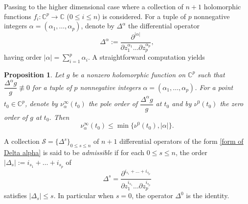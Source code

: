 \documentclass[english, 12pt]{amsart}
\theoremstyle{plain}
\newtheorem{pro}[thm]{Proposition}
\theoremstyle{remark}
\numberwithin{equation}{section}
\theoremstyle{plain}
\theoremstyle{named}
\begin{document}
Passing to the higher dimensional case where a collection of $n+1$ holomorphic functions $f_i\colon\mathbb{C}^p\rightarrow \mathbb{C}$ ($0\leq i\leq n$) is considered. For a tuple of $p$ nonnegative integers $\alpha=(\alpha_1,\dots,\alpha_p)$, denote by $\Delta^{\alpha}$ the differential operator
\begin{equation}
\label{form of Delta alpha}
\Delta^{\alpha}
:=
\dfrac{\partial^{|\alpha|}}{\partial z_1^{\alpha_1}\dots\partial z_p^{\alpha_p}},
\end{equation}
having order $|\alpha|=\sum_{i=1}^{p}\alpha_i$. A straightforward computation \cite{Fujimoto1985} yields 
\begin{pro}
\label{vanishing order estimate and pole of logarithmic derivative}
Let $g$ be a nonzero holomorphic function on $\mathbb{C}^p$ such that $\dfrac{\Delta^{\alpha}g}{g}\not\equiv 0$ for a tuple of $p$ nonnegative integers $\alpha=(\alpha_1,\dots,\alpha_p)$. For a point $t_0\in\mathbb{C}^p$, denote by $\nu^{\infty}_{\alpha}(t_0)$ the pole order of $\dfrac{\Delta^{\alpha}g}{g}$ at $t_0$ and by $\nu^{0}(t_0)$ the zero order of $g$ at $t_0$. Then
$$
\nu^{\infty}_{\alpha}(t_0)
\leq
\min\{\nu^{0}(t_0),|\alpha|
\}.
$$
\end{pro}	

A collection $\mathcal{S}=\{\Delta^s\}_{0\leq s\leq n}$ of $n+1$ differential operators of the form \eqref{form of Delta alpha} is said to be {\sl admissible} if for each $0\leq s\leq n$, the order $|\Delta_s|:=i_{s_1}+\dots+i_{s_p}$ of
$$\Delta^s=
\dfrac{\partial^{i_{s_1}+\dots+i_{s_p}}}{\partial z_1^{i_{s_1}}\dots\partial z_p^{i_{s_p}}}$$   satisfies
$|\Delta_s|\leq s$. In particular when $s=0$, the operator $\Delta^0$ is the identity.
\end{document}
